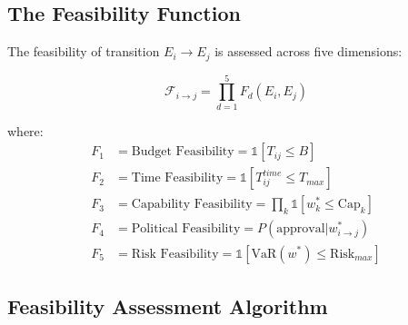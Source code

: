 \subsection{The Feasibility Function}

\begin{definition}
The feasibility of transition $E_i \to E_j$ is assessed across five dimensions:

\begin{equation}
\mathcal{F}_{i \to j} = \prod_{d=1}^{5} F_d(E_i, E_j)
\end{equation}

where:
\begin{align}
F_1 &= \text{Budget Feasibility} = \mathbb{1}[T_{ij} \leq B] \\
F_2 &= \text{Time Feasibility} = \mathbb{1}[T_{ij}^{time} \leq T_{max}] \\
F_3 &= \text{Capability Feasibility} = \prod_k \mathbb{1}[w^*_k \leq \text{Cap}_k] \\
F_4 &= \text{Political Feasibility} = P(\text{approval} | w^*_{i \to j}) \\
F_5 &= \text{Risk Feasibility} = \mathbb{1}[\text{VaR}(w^*) \leq \text{Risk}_{max}]
\end{align}
\end{definition}

\subsection{Feasibility Assessment Algorithm}

